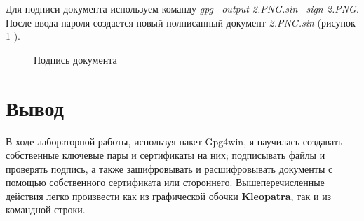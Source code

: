 \documentclass[10pt,a4paper]{report}
\begin{document}
Для подписи документа используем команду \textit{gpg --output 2.PNG.sin --sign 2.PNG}. После ввода пароля создается новый полписанный документ \textit{2.PNG.sin} (рисунок \ref{ris:image19} ).
\begin{figure}[h]	
\caption{Подпись документа}
\label{ris:image19}
\end{figure}

\section{Вывод}
В ходе лабораторной работы, используя пакет Gpg4win, я научилась создавать собственные ключевые пары и сертификаты на них; подписывать файлы и проверять подпись, а также зашифровывать и расшифровывать документы с помощью собственного сертификата или стороннего. Вышеперечисленные действия легко произвести как из графической обочки \textbf{Kleopatra}, так и из командной строки. 
\end{document}
